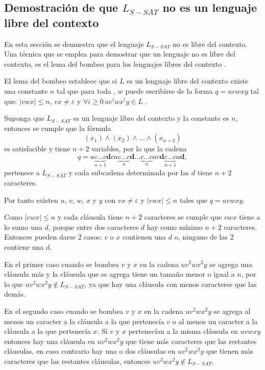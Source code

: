 \documentclass[12pt]{article}
\begin{document}
\subsection{Demostración de que $L_{S-SAT}$ no es un lenguaje libre del contexto}

En esta sección se demuestra que el lenguaje $L_{S-SAT}$ no es libre del contexto. Una técnica que se emplea para demostrar que un lenguaje no es libre del contexto, es el lema del bombeo para los lenguajes
libres del contexto \cite{authomataTheory}. 

El lema del bombeo establece que si $L$ es un lenguaje libre del contexto
existe una constante $n$ tal que para toda , $w$ puede escribirse de la forma $q=uvwxy$ tal que:
$|vwx|\leq n$, $vx\neq \varepsilon$ y $\forall i\geq 0\,uv^iwx^iy\in L$ \cite{authomataTheory}.

Suponga que $L_{S-SAT}$ es un lenguaje libre del contexto y la constante es $n$, entonces se cumple que la fórmula
$$(x_1)\wedge(x_2)\wedge\ldots\wedge(x_{n+2})$$ es satisfacible y tiene $n+2$ variables, por lo que la cadena
$$q=a\underbrace{c\ldots c}_{n+1}\mathbf{d}ca\underbrace{c\ldots c}_{n}\mathbf{d}\ldots \underbrace{c\ldots c}_{n}ac\mathbf{d}\underbrace{c\ldots c}_{n+1}a\mathbf{d},$$
pertenece a $L_{S-SAT}$ y cada subcadena determinada por las $d$ tiene $n+2$ caracteres. 

Por tanto existen $u$, $v$, $w$, $x$ y $y$ con $vx\neq \varepsilon$ y $|vwx|\leq n$
tales que $q=uvwxy$.

Como $|vwx|\leq n$ y cada cláusula tiene $n+2$ caracteres se cumple que $vwx$ tiene a lo sumo una $d$, porque entre dos caracteres $d$ hay como mínimo $n+2$ caracteres. Entonces pueden darse 2 casos: $v$ o $x$
contienen una $d$ o, ninguno de las 2 contiene una $d$.

En el primer caso cuando se bombea $v$ y $x$ en la cadena $uv^2wx^2y$ se agrega una cláusula más y la cláusula
que se agrega tiene un tamaño menor o igual a $n$, por lo que $uv^2wx^2y\notin L_{S-SAT}$, ya que hay una cláusula
con menos caracteres que las demás.

En el segundo caso cuando se bombea $v$ y $x$ en la cadena $uv^2wx^2y$
se agrega al menos un caracter a la cláusula a la que pertenecía $v$ o al menos un caracter a la cláusula a la que pertenecía $x$.
Si $v$ y $x$ pertenecían a la misma cláusula en $uvwxy$ entonces hay una cláusula en $uv^2wx^2y$ que tiene más caracteres que las restantes cláusulas,
en caso contrario hay una o dos cláusulas en $uv^2wx^2y$ que tienen más caracteres que las restantes cláusulas, entonces $uv^2wx^2y\notin L_{S-SAT}$.
\end{document}
